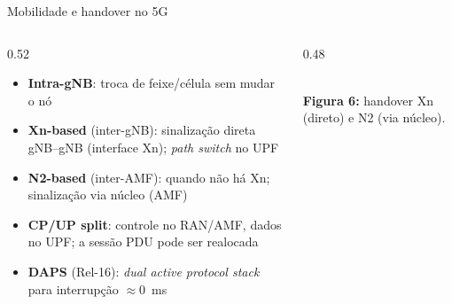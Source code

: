 \documentclass[aspectratio=169,11pt]{beamer}
\begin{document}
\begin{frame}{Mobilidade e handover no 5G}
  \begin{columns}
    \begin{column}{0.52\textwidth}
      \begin{itemize}
        \item \textbf{Intra-gNB}: troca de feixe/célula sem mudar o nó
        \item \textbf{Xn-based} (inter-gNB): sinalização direta gNB--gNB (interface Xn); \emph{path switch} no UPF
        \item \textbf{N2-based} (inter-AMF): quando não há Xn; sinalização via núcleo (AMF)
        \item \textbf{CP/UP split}: controle no RAN/AMF, dados no UPF; a sessão PDU pode ser realocada
        \item \textbf{DAPS} (Rel-16): \emph{dual active protocol stack} para interrupção $\approx 0$~ms
      \end{itemize}
    \end{column}
    \begin{column}{0.48\textwidth}
      \begin{center}
        \\[1mm]
        {\scriptsize \textbf{Figura 6:} handover Xn (direto) e N2 (via núcleo).}
      \end{center}
    \end{column}
  \end{columns}
\end{frame}
\end{document}
